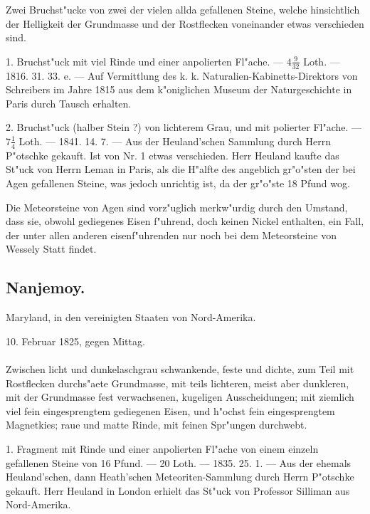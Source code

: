 \documentclass[a4paper, 11pt, oneside, polutonikogreek, german]{article}
\begin{document}
Zwei Bruchst"ucke von zwei der vielen allda gefallenen Steine, welche hinsichtlich der Helligkeit der Grundmasse und der Rostflecken voneinander etwas verschieden sind.

1. Bruchst"uck mit viel Rinde und einer anpolierten Fl"ache. --- $4\frac{9}{32}$ Loth. --- 1816. 31. 33. e. --- Auf Vermittlung des k. k. Naturalien-Kabinetts-Direktors von Schreibers im Jahre 1815 aus dem k"oniglichen Museum der Naturgeschichte in Paris durch Tausch erhalten.

2. Bruchst"uck (halber Stein ?) von lichterem Grau, und mit polierter Fl"ache. --- $7\frac{1}{4}$ Loth. --- 1841. 14. 7. --- Aus der Heuland'schen Sammlung durch Herrn P"otschke gekauft. Ist von Nr. 1 etwas verschieden. Herr Heuland kaufte das St"uck von Herrn Leman in Paris, als die H"alfte des angeblich gr"o"sten der bei Agen gefallenen Steine, was jedoch unrichtig ist, da der gr"o"ste 18 Pfund wog.

\setlength{\leftskip}{10mm}
\setlength{\parindent}{0pt}

{\footnotesize Die Meteorsteine von Agen sind vorz"uglich merkw"urdig durch den Umstand, dass sie, obwohl gediegenes Eisen f"uhrend, doch keinen Nickel enthalten, ein Fall, der unter allen anderen eisenf"uhrenden nur noch bei dem Meteorsteine von Wessely Statt findet.}

\setlength{\leftskip}{0pt}
\setlength{\parindent}{20pt}

\subsection{Nanjemoy.}
\begin{center}
\small
Maryland, in den vereinigten Staaten von Nord-Amerika.

10. Februar 1825, gegen Mittag.
\end{center}
\paragraph{}
Zwischen licht und dunkelaschgrau schwankende, feste und dichte, zum Teil mit Rostflecken durchs"aete Grundmasse, mit teils lichteren, meist aber dunkleren, mit der Grundmasse fest verwachsenen, kugeligen Ausscheidungen; mit ziemlich viel fein eingesprengtem gediegenen Eisen, und h"ochst fein eingesprengtem Magnetkies; raue und matte Rinde, mit feinen Spr"ungen durchwebt.

1. Fragment mit Rinde und einer anpolierten Fl"ache von einem einzeln gefallenen Steine von 16 Pfund. --- 20 Loth. --- 1835. 25. 1. --- Aus der ehemals Heuland'schen, dann Heath'schen Meteoriten-Sammlung durch Herrn P"otschke gekauft. Herr Heuland in London erhielt das St"uck von Professor Silliman aus Nord-Amerika.
\end{document}
